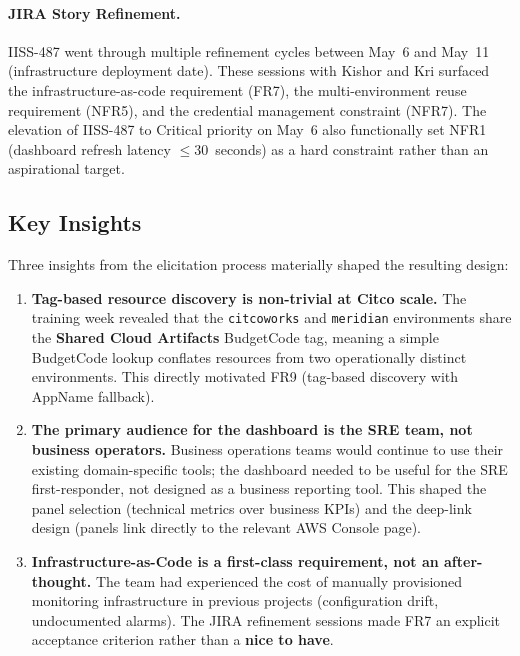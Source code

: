 \paragraph{JIRA Story Refinement.}
IISS-487 went through multiple refinement cycles between May~6 and
May~11 (infrastructure deployment date). These sessions with Kishor
and Kri surfaced the infrastructure-as-code requirement (FR7), the
multi-environment reuse requirement (NFR5), and the credential
management constraint (NFR7). The elevation of IISS-487 to Critical
priority on May~6 also functionally set NFR1 (dashboard refresh
latency $\leq$30~seconds) as a hard constraint rather than an aspirational
target.

\subsection{Key Insights}

Three insights from the elicitation process materially shaped the
resulting design:

\begin{enumerate}
    \item \textbf{Tag-based resource discovery is non-trivial at Citco
          scale.} The training week revealed that the \texttt{citcoworks}
          and \texttt{meridian} environments share the
          \textbf{Shared Cloud Artifacts} BudgetCode tag, meaning
          a simple BudgetCode lookup conflates resources from
          two operationally distinct environments. This directly
          motivated FR9 (tag-based discovery with AppName
          fallback).

    \item \textbf{The primary audience for the dashboard is the SRE
          team, not business operators.} Business operations teams would
          continue to use their existing domain-specific tools; the
          dashboard needed to be useful for the SRE first-responder,
          not designed as a business reporting tool. This shaped the
          panel selection (technical metrics over business KPIs) and
          the deep-link design (panels link directly to the relevant AWS
          Console page).

    \item \textbf{Infrastructure-as-Code is a first-class requirement,
          not an after-thought.} The team had experienced the cost of
          manually provisioned monitoring infrastructure in previous
          projects (configuration drift, undocumented alarms). The JIRA
          refinement sessions made FR7 an explicit acceptance criterion
          rather than a \textbf{nice to have}.
\end{enumerate}

